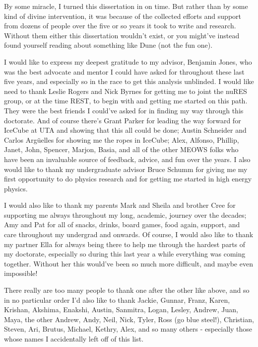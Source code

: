 \documentclass[
11pt, 
english, 
doublespacing, %
headsepline, %
usenames,dvipsnames
]{dissertation_class} %
\numberwithin{figure}{section}
\numberwithin{table}{section}
\numberwithin{equation}{section}
\begin{document}
\begin{acknowledgements}
    \addchaptertocentry{\acknowledgementname} %

    By some miracle, I turned this dissertation in on time. 
    But rather than by some kind of divine intervention, it was because of the collected efforts and support from dozens of people over the five or so years it took to write and research. 
    Without them either this dissertation wouldn't exist, or you might've instead found yourself reading about something like Dune (not the fun one). 

    I would like to express my deepest gratitude to my advisor, Benjamin Jones, who was the best advocate and mentor I could have asked for throughout these last five years, and especially so in the race to get this analysis unblinded. 
    I would like need to thank Leslie Rogers and Nick Byrnes for getting me to joint the nuRES group, or at the time REST, to begin with and getting me started on this path. They were the best friends I could've asked for in finding my way through this doctorate. 
    And of course there's Grant Parker for leading the way forward for IceCube at UTA and showing that this all could be done; Austin Schneider and Carlos Arg{\"u}elles for showing me the ropes in IceCube; Alex, Alfonso, Phillip, Janet, John, Spencer, Marjon, Basia, and all of the other MEOWS folks who have been an invaluable source of feedback, advice, and fun over the years. 
    I also would like to thank my undergraduate advisor Bruce Schumm for giving me my first opportunity to do physics research and for getting me started in high energy physics. 

    I would also like to thank my parents Mark and Sheila and brother Cree for supporting me always throughout my long, academic, journey over the decades; Amy and Pat for all of snacks, drinks, board games, food again, support, and care throughout my undergrad and onwards.
    Of course, I would also like to thank my partner Ella for always being there to help me through the hardest parts of my doctorate, especially so during this last year a while everything was coming together. 
    Without her this would've been so much more difficult, and maybe even impossible! 

    There really are too many people to thank one after the other like above, and so in no particular order I'd also like to thank Jackie, Gunnar, Franz, Karen, Krishan, Akshima, Enakshi, Austin, Sanmitra, Logan, Lesley, Andrew, Juan, Maya, the other Andrew, Andy, Neil, Nick, Tyler, Ross (go blue steel!), Christian, Steven, Ari, Brutus, Michael, Kethry, Alex, and so many others - especially those whose names I accidentally left off of this list.


\end{acknowledgements}
\end{document}

